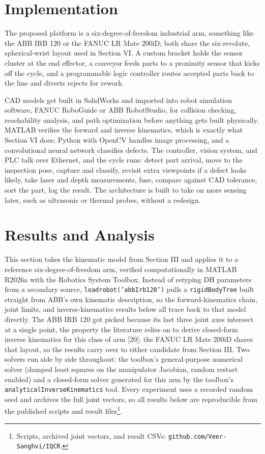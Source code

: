 \documentclass[conference]{IEEEtran}
\begin{document}
\section{Implementation}
The proposed platform is a six-degree-of-freedom industrial arm, something like the ABB IRB 120 or the FANUC LR Mate 200iD; both share the six-revolute, spherical-wrist layout used in Section VI. A custom bracket holds the sensor cluster at the end effector, a conveyor feeds parts to a proximity sensor that kicks off the cycle, and a programmable logic controller routes accepted parts back to the line and diverts rejects for rework.

CAD models get built in SolidWorks and imported into robot simulation software, FANUC RoboGuide or ABB RobotStudio, for collision checking, reachability analysis, and path optimization before anything gets built physically. MATLAB verifies the forward and inverse kinematics, which is exactly what Section VI does; Python with OpenCV handles image processing, and a convolutional neural network classifies defects. The controller, vision system, and PLC talk over Ethernet, and the cycle runs: detect part arrival, move to the inspection pose, capture and classify, revisit extra viewpoints if a defect looks likely, take laser and depth measurements, fuse, compare against CAD tolerance, sort the part, log the result. The architecture is built to take on more sensing later, such as ultrasonic or thermal probes, without a redesign.

\section{Results and Analysis}
\label{sec:results}
This section takes the kinematic model from Section III and applies it to a reference six-degree-of-freedom arm, verified computationally in MATLAB R2026a with the Robotics System Toolbox. Instead of retyping DH parameters from a secondary source, \texttt{loadrobot('abbIrb120')} pulls a \texttt{rigidBodyTree} built straight from ABB's own kinematic description, so the forward-kinematics chain, joint limits, and inverse-kinematics results below all trace back to that model directly. The ABB IRB 120 got picked because its last three joint axes intersect at a single point, the property the literature relies on to derive closed-form inverse kinematics for this class of arm {[}20{]}; the FANUC LR Mate 200iD shares that layout, so the results carry over to either candidate from Section III. Two solvers run side by side throughout: the toolbox's general-purpose numerical solver (damped least squares on the manipulator Jacobian, random restart enabled) and a closed-form solver generated for this arm by the toolbox's \texttt{analyticalInverseKinematics} tool. Every experiment uses a recorded random seed and archives the full joint vectors, so all results below are reproducible from the published scripts and result files\footnote{Scripts, archived joint vectors, and result CSVs: \texttt{github.com/Veer-Sanghvi/IQCR}.}.
\end{document}
